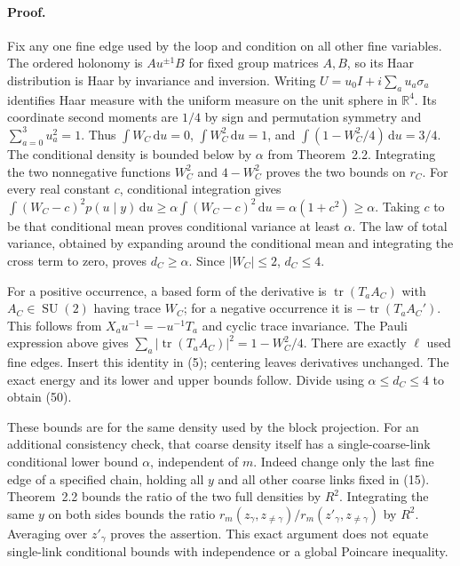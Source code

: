 \documentclass[11pt]{article}
\newcommand{\SU}{\operatorname{SU}}
\newcommand{\tr}{\operatorname{tr}}
\newcommand{\dd}{\,\mathrm d}
\begin{document}
\paragraph{Proof.}
Fix any one fine edge used by the loop and condition on all other fine
variables. The ordered holonomy is $A u^{\pm1}B$ for fixed group matrices
$A,B$, so its Haar distribution is Haar by invariance and inversion.
Writing $U=u_0I+i\sum_a u_a\sigma_a$ identifies Haar measure with the
uniform measure on the unit sphere in $\mathbb R^4$. Its coordinate
second moments are $1/4$ by sign and permutation symmetry and
$\sum_{a=0}^3u_a^2=1$. Thus
$\int W_C\dd u=0$, $\int W_C^2\dd u=1$, and
$\int(1-W_C^2/4)\dd u=3/4$.
The conditional density is bounded below by $\alpha$ from
Theorem~2.2. Integrating the two nonnegative functions
$W_C^2$ and $4-W_C^2$ proves the two bounds on $r_C$.
For every real constant $c$, conditional integration gives
$\int(W_C-c)^2p(u\mid y)\dd u\geq\alpha\int(W_C-c)^2\dd u
=\alpha(1+c^2)\geq\alpha$.
Taking $c$ to be that conditional mean proves conditional variance
at least $\alpha$. The law of total variance, obtained by expanding
around the conditional mean and integrating the cross term to zero,
proves $d_C\geq\alpha$. Since $|W_C|\leq2$, $d_C\leq4$.

For a positive occurrence, a based form of the derivative is
$\tr(T_aA_C)$ with $A_C\in\SU(2)$ having trace $W_C$; for a negative
occurrence it is $-\tr(T_aA_C')$. This follows from
$X_a u^{-1}=-u^{-1}T_a$ and cyclic trace invariance. The Pauli expression
above gives $\sum_a|\tr(T_aA_C)|^2=1-W_C^2/4$.
There are exactly $\ell$ used fine edges. Insert this identity in
(5); centering leaves derivatives unchanged. The exact energy
and its lower and upper bounds follow. Divide using
$\alpha\leq d_C\leq4$ to obtain (50).



These bounds are for the same density used by the block projection.
For an additional consistency check, that coarse density itself has a
single-coarse-link conditional lower bound $\alpha$, independent of $m$.
Indeed change only the last fine edge of a specified chain, holding all
$y$ and all other coarse links fixed in (15).
Theorem~2.2 bounds the ratio of the two full densities
by $R^2$. Integrating the same $y$ on both sides bounds the ratio
$r_m(z_\gamma,z_{\ne\gamma})/r_m(z'_\gamma,z_{\ne\gamma})$ by $R^2$.
Averaging over $z'_\gamma$ proves the assertion. This exact argument
does not equate single-link conditional bounds with independence or a
global Poincare inequality.
\end{document}
